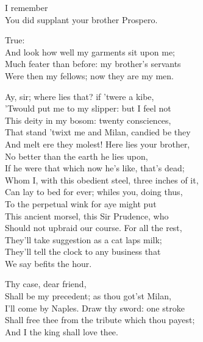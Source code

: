 \begin{verse_speech}[Sebastian] 
I remember\\
You did supplant your brother Prospero.
\end{verse_speech}

\begin{verse_speech}[Antonio] 
True:\\
And look how well my garments sit upon me;\\
Much feater than before: my brother's servants\\
Were then my fellows; now they are my men.
\end{verse_speech}

\begin{verse_speech}[Antonio] 
Ay, sir; where lies that? if 'twere a kibe,\\
'Twould put me to my slipper: but I feel not\\
This deity in my bosom: twenty consciences,\\
That stand 'twixt me and Milan, candied be they\\
And melt ere they molest! Here lies your brother,\\
No better than the earth he lies upon,\\
If he were that which now he's like, that's dead;\\
Whom I, with this obedient steel, three inches of it,\\
Can lay to bed for ever; whiles you, doing thus,\\
To the perpetual wink for aye might put\\
This ancient morsel, this Sir Prudence, who\\
Should not upbraid our course. For all the rest,\\
They'll take suggestion as a cat laps milk;\\
They'll tell the clock to any business that\\
We say befits the hour.
\end{verse_speech}

\begin{verse_speech}[Sebastian] 
Thy case, dear friend,\\
Shall be my precedent; as thou got'st Milan,\\
I'll come by Naples. Draw thy sword: one stroke\\
Shall free thee from the tribute which thou payest;\\
And I the king shall love thee.
\end{verse_speech}

